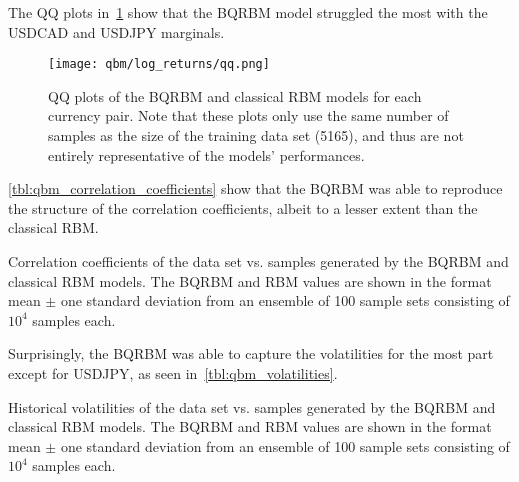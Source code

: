 The QQ plots in~\cref{fig:qbm_log_returns_qq} show that the BQRBM model struggled the most with the USDCAD and USDJPY marginals.
\begin{figure}[!htb]
    \begin{center}
        \texttt{[image: qbm/log\_returns/qq.png]}
    \end{center}
    \caption{QQ plots of the BQRBM and classical RBM models for each currency pair. Note that these plots only use the same number of samples as the size of the training data set (5165), and thus are not entirely representative of the models' performances.}
    \label{fig:qbm_log_returns_qq}
\end{figure}

\cref{tbl:qbm_correlation_coefficients} show that the BQRBM was able to reproduce the structure of the correlation coefficients, albeit to a lesser extent than the classical RBM.
\begin{table}[!htb]
    \centering
    \begin{adjustbox}{max width=\textwidth}
        
    \end{adjustbox}
    \caption{Correlation coefficients of the data set vs. samples generated by the BQRBM and classical RBM models. The BQRBM and RBM values are shown in the format mean \(\pm\) one standard deviation from an ensemble of 100 sample sets consisting of \( 10^4 \) samples each.}
    \label{tbl:qbm_correlation_coefficients}
\end{table}

Surprisingly, the BQRBM was able to capture the volatilities for the most part except for USDJPY, as seen in~\cref{tbl:qbm_volatilities}.
\begin{table}[!htb]
    \centering
    \begin{adjustbox}{max width=\textwidth}
        
    \end{adjustbox}
    \caption{
        Historical volatilities of the data set vs. samples generated by the BQRBM and classical RBM models.
        The BQRBM and RBM values are shown in the format mean \(\pm\) one standard deviation from an ensemble of 100 sample sets consisting of \( 10^4 \) samples each.
    }
    \label{tbl:qbm_volatilities}
\end{table}

